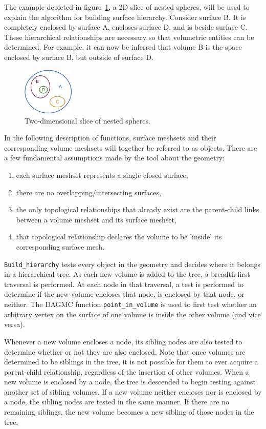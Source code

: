 \documentclass{anstrans}
\begin{document}
The example depicted in figure~\ref{fig:spheres}, a 2D slice of nested spheres, will 
be used to explain the algorithm for building surface hierarchy. Consider surface B.
It is completely enclosed by surface A, encloses surface D, and is beside surface C. 
These hierarchical relationships are necessary so that volumetric entities can be
determined.  For example, it can now be inferred that volume B is the space enclosed 
by surface B, but outside of surface D.

\begin{figure}[ht]
 \centering
 \includegraphics[width=0.22\textwidth]{../figs/nested_spheres.png}
 \caption{Two-dimensional slice of nested spheres.}
 \label{fig:spheres}
\end{figure}

In the following description of functions, surface meshsets and their corresponding volume meshsets will
together be referred to as objects.  
There are a few fundamental assumptions made by the tool about the geometry:
\begin{enumerate}
\item each surface meshset represents a single closed surface,
\item there are no overlapping/intersecting surfaces, 
\item the only topological relationships that already exist are the parent-child links between a volume meshset and its surface meshset, 
\item that topological relationship declares the volume to be 'inside' its corresponding surface mesh.
\end{enumerate}

\texttt{Build\_hierarchy} tests every object in the geometry and decides where
it belongs in a hierarchical tree.  As each new volume is added to the tree, a
breadth-first traversal is performed.  At each node in that traversal, a test
is performed to determine if the new volume encloses that node, is enclosed by
that node, or neither.  The DAGMC function \texttt{point\_in\_volume} is used
to first test whether an arbitrary vertex on the surface of one volume is
inside the other volume (and vice versa).

Whenever a new volume encloses a node, its sibling nodes are also tested to
determine whether or not they are also enclosed.  Note that once volumes are
determined to be siblings in the tree, it is not possible for them to ever
acquire a parent-child relationship, regardless of the insertion of other
volumes.  When a new volume is enclosed by a node, the tree is descended to
begin testing against another set of sibling volumes.  If a new volume neither
encloses nor is enclosed by a node, the sibling nodes are tested in the same
manner.  If there are no remaining siblings, the new volume becomes a new
sibling of those nodes in the tree.
\end{document}
